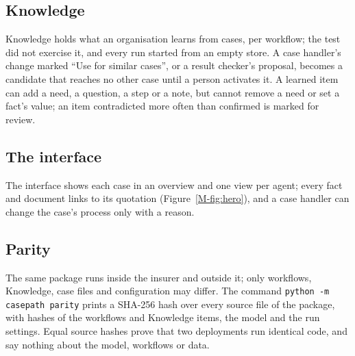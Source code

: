 \subsection{Knowledge}
\label{sec:knowledge}

Knowledge holds what an organisation learns from cases, per workflow; the test did not exercise it, and every run started from an empty store. A case handler's change marked ``Use for similar cases'', or a result checker's proposal, becomes a candidate that reaches no other case until a person activates it. A learned item can add a need, a question, a step or a note, but cannot remove a need or set a fact's value; an item contradicted more often than confirmed is marked for review.

\subsection{The interface}
\label{sec:interface}

The interface shows each case in an overview and one view per agent; every fact and document links to its quotation (Figure~\ref{M-fig:hero}), and a case handler can change the case's process only with a reason.

\subsection{Parity}
\label{sec:parity}

The same package runs inside the insurer and outside it; only workflows, Knowledge, case files and configuration may differ. The command \texttt{python -m casepath parity} prints a SHA-256 hash over every source file of the package, with hashes of the workflows and Knowledge items, the model and the run settings. Equal source hashes prove that two deployments run identical code, and say nothing about the model, workflows or data.

